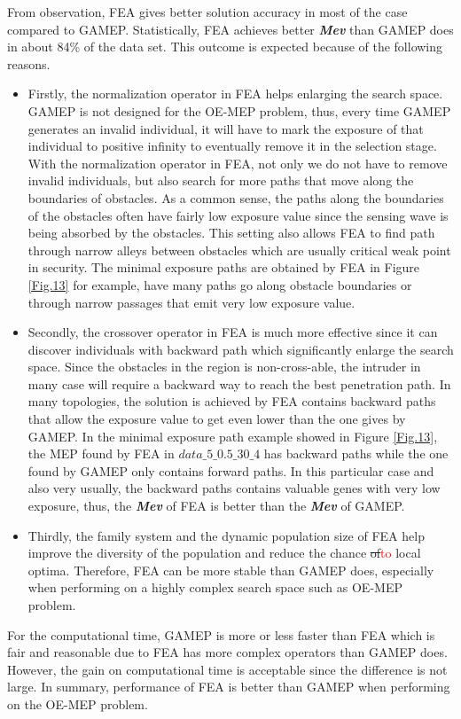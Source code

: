 \documentclass[final]{elsarticle}
\begin{document}
From observation, FEA gives better solution accuracy in most of the case compared to GAMEP. Statistically, FEA achieves better \textit{\textbf{Mev}} than GAMEP does in about 84\% of the data set. This outcome is expected because of  the following reasons.
\begin{itemize}
	\item Firstly, the normalization operator in FEA helps enlarging the search space. GAMEP is not designed for the OE-MEP problem, thus, every time GAMEP generates an invalid individual, it will have to mark the exposure of that individual to positive infinity to eventually remove it in the selection stage. With the normalization operator in FEA, not only we do not have to remove invalid individuals, but also search for more paths that move along the boundaries of obstacles. As a common sense, the paths along the boundaries of the obstacles often have fairly low exposure value since the sensing wave is being absorbed by the obstacles. This setting also allows FEA to find path through narrow alleys between obstacles which are usually critical weak point in security. The minimal exposure paths are obtained by FEA in Figure \ref{Fig.13} for example, have many paths go along obstacle boundaries or through narrow passages that emit very low exposure value.
	\item Secondly, the crossover operator in FEA is much more effective since it can discover individuals with backward path which significantly enlarge the search space. Since the obstacles in the region is non-cross-able, the intruder in many case will require a backward way to reach the best penetration path. In many topologies, the solution is achieved by FEA contains backward paths that allow the exposure value to get even lower than the one gives by GAMEP. In the minimal exposure path example showed in Figure \ref{Fig.13}, the MEP found by FEA in $data\_5\_0.5\_30\_4 $ has backward paths while the one found by GAMEP only contains forward paths. In this particular case and also very usually, the backward paths contains valuable genes with very low exposure, thus, the \textbf{\textit{Mev}} of FEA is better than the \textbf{\textit{Mev}} of GAMEP. 
	\item Thirdly, the family system and the dynamic population size of FEA help improve the diversity of the population and reduce the chance \sout{of}\textcolor{red}{to} local optima. Therefore, FEA can be more stable than GAMEP does, especially when performing on a highly complex search space such as OE-MEP problem. 
\end{itemize}
For the computational time, GAMEP is more or less faster than FEA which is fair and reasonable due to FEA has more complex operators than GAMEP does. However, the gain on computational time is acceptable since the difference is not large. In summary, performance of FEA is better than GAMEP when performing on the OE-MEP problem. 
\end{document}
